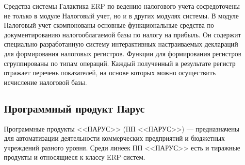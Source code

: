 \documentclass[14pt,a4paper]{reportmod}
\begin{document}
Средства системы Галактика ERP по ведению налогового учета сосредоточены не только в модуле Налоговый учет, но и в других модулях системы. В модуле Налоговый учет скомпонованы основные функциональные средства по документированию налогооблагаемой базы по налогу на прибыль. Он содержит специально разработанную систему интерактивных настраиваемых деклараций для формирования налоговых регистров. Функции для формирования регистров сгруппированы по типам операций. Каждый полученный в результате регистр отражает перечень показателей, на основе которых можно осуществить исчисление налоговой базы.


\subsection{Программный продукт Парус}
Программные продукты <<ПАРУС>> (ПП <<ПАРУС>>) — предназначены для автоматизации деятельности коммерческих предприятий и бюджетных учреждений разного уровня. Среди линеек ПП <<ПАРУС>> есть и тиражные продукты и относящиеся к классу ERP-систем.
\end{document}
